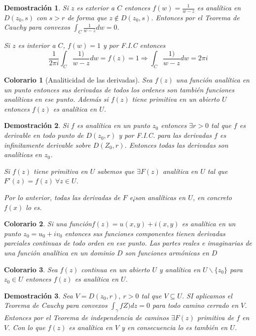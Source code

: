\documentclass[12pt]{book}
\newtheorem*{dem}{Demostración}
\newtheorem{col}{Colorario}[chapter]
\begin{document}
\begin{dem}
Si $z$ es exterior a $C$ entonces $f(w) = \frac{1}{w-z}$ es analítica en $D(z_0,s)$ con $s>r$ de forma que $z\notin D(z_0,s)$. Entonces por el Teorema de Cauchy para convexos $\int_C \frac{1}{w-z}dw = 0$.

Si $z$ es interior a $C$, $f(w)=1$ y por F.I.C entonces 
$$\frac{1}{2\pi i}\int_C \frac{1)}{w-z}dw = f(z) = 1 \Rightarrow \int_C \frac{1)}{w-z}dw = 2\pi i$$
\end{dem}



\begin{col}[Analiticidad de las derivadas]
Sea $f(z)$ una función analítica en un punto entonces sus derivadas de todos los ordenes son también funciones analíticas en ese punto.
Además si $f(z)$ tiene primitiva en un abierto $U$ entonces $f(z)$ es analítica en $U$.
\end{col}

\begin{dem}
Si $f$ es analítica en un punto $z_0$ entonces $\exists r>0$ tal que $f$ es derivable en todo punto de $D(z_0,r)$ y por F.I.C. para las derivadas $f$ es infinitamente derivable sobre $D(Z_0,r)$. Entonces todas las derivadas son analíticas en $z_0$.

Si $f(z)$ tiene primitiva en $U$ sabemos que $\exists F(z)$ analítica en $U$ tal que $F'(z) = f(z)\ \forall z\in U$.

Por lo anterior, todas las derivadas de $F$ e¡son analíticas en $U$, en  concreto $f(x)$ lo es.
\end{dem}

\begin{col}
Si una función$f(z) = u(x,y)+i(x,y)$ es analítica en un punto $z_0 = u_0 + iv_0$ entonces sus funciones componentes tienen derivadas parciales continuas de todo orden en ese punto.
Las partes reales e imaginarias de una función analítica en un dominio $D$ son funciones armónicas en $D$ 
\end{col}

\begin{col}
Sea $f(z)$ continua en un abierto $U$ y analítica en $U \backslash\{ z_0 \}$ para $z_0 \in U$ entonces $f(z)$ es analítica en $U$.
\end{col}

\begin{dem}
Sea $V=D(z_0,r),\ r>0$ tal que $V \subseteq U$. SI aplicamos el Teorema de Cauchy para convexos $\int_\gamma fZ)dz=0$ para todo camino cerrado en $V$. Entonces por el Teorema de independencia de caminos $\exists F(z)$ primitiva de $f$ en $V$. Con lo que $f(z)$ es analítica en $V$ y en consecuencia lo es también en $U$.
\end{dem}
\end{document}
